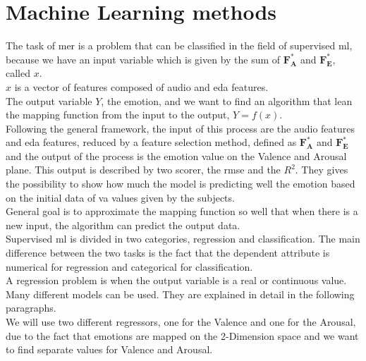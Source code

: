 \section{Machine Learning methods}
The task of \gls{mer} is a problem that can be classified in the field of supervised \gls{ml}, because we have an input variable which is given by the sum of $\textbf{F}_\textbf{A}^*$ and $\textbf{F}_\textbf{E}^*$, called $x$.
\\
$x$ is a vector of features composed of audio and \gls{eda} features.
\\
The output variable $Y$, the emotion, and we want to find an algorithm that lean the mapping function from the input to the output, $Y=f(x)$.
\\
Following the general framework, the input of this process are the audio features and \gls{eda} features, reduced by a feature selection method, defined as $\textbf{F}_\textbf{A}^*$ and $\textbf{F}_\textbf{E}^*$ and the output of the process is the emotion value on the Valence and Arousal plane. This output is described by two scorer, the \gls{rmse} and the $R^2$. They gives the possibility to show how much the model is predicting well the emotion based on the initial data of \gls{va} values given by the subjects.
\\ \indent
General goal is to approximate the mapping function so well that when there is a new input, the algorithm can predict the output data.
\\
Supervised \gls{ml} is divided in two categories, regression and classification. The main difference between the two tasks is the fact that the dependent attribute is numerical for regression and categorical for classification.
\\ \indent
A regression problem is when the output variable is a real or continuous value. Many different models can be used. They are explained in detail in the following paragraphs.
\\ \indent
We will use two different regressors, one for the Valence and one for the Arousal, due to the fact that emotions are mapped on the 2-Dimension space and we want to find separate values for Valence and Arousal.

